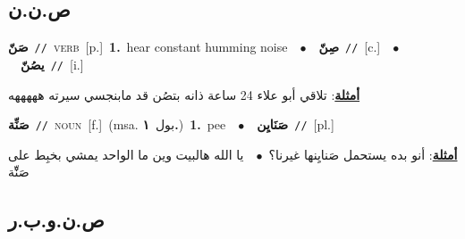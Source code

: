 \documentclass[10pt,a4paper,twoside]{article} %
\begin{document}
\begin{multicols}{2}
\vspace{-3mm}
\subsection*{\color{blue}\foreignlanguage{arabic}{ص.ن.ن}\color{blue}{}} 

{\setlength\topsep{0pt}\textbf{\foreignlanguage{arabic}{صَنّ}}\ {\color{gray}\texttt{//}\color{black}}\ \textsc{verb}\ [p.]\ \textbf{1.}~hear constant humming noise\ \ $\bullet$\ \ \setlength\topsep{0pt}\textbf{\foreignlanguage{arabic}{صِنّ}}\ {\color{gray}\texttt{//}\color{black}}\ [c.]\ \ $\bullet$\ \ \setlength\topsep{0pt}\textbf{\foreignlanguage{arabic}{يصُنّ}}\ {\color{gray}\texttt{//}\color{black}}\ [i.]\  \begin{flushright}\color{gray}\foreignlanguage{arabic}{\textbf{\underline{\foreignlanguage{arabic}{أمثلة}}}: تلاقي أبو علاء 24 ساعة ذانه بتصُن قد مابنجسي سيرته هههههه}\end{flushright}\color{black}} \vspace{2mm}

{\setlength\topsep{0pt}\textbf{\foreignlanguage{arabic}{صَنِّة}}\ {\color{gray}\texttt{//}\color{black}}\ \textsc{noun}\ [f.]\ \color{gray}(msa. \foreignlanguage{arabic}{بول}~\foreignlanguage{arabic}{\textbf{١.}})\color{black}\ \textbf{1.}~pee\ \ $\bullet$\ \ \setlength\topsep{0pt}\textbf{\foreignlanguage{arabic}{صَنَايِن}}\ {\color{gray}\texttt{//}\color{black}}\ [pl.]\  \begin{flushright}\color{gray}\foreignlanguage{arabic}{\textbf{\underline{\foreignlanguage{arabic}{أمثلة}}}: أنو بده يستحمل صَنايِنها غيرنا؟\ $\bullet$\ \  يا الله هالبيت وين ما الواحد يمشي بخبِط على صَنِّْة}\end{flushright}\color{black}} \vspace{2mm}

\vspace{-3mm}
\subsection*{\color{blue}\foreignlanguage{arabic}{ص.ن.و.ب.ر}\color{blue}{ (ntws)}} 


\end{multicols}
\end{document}
